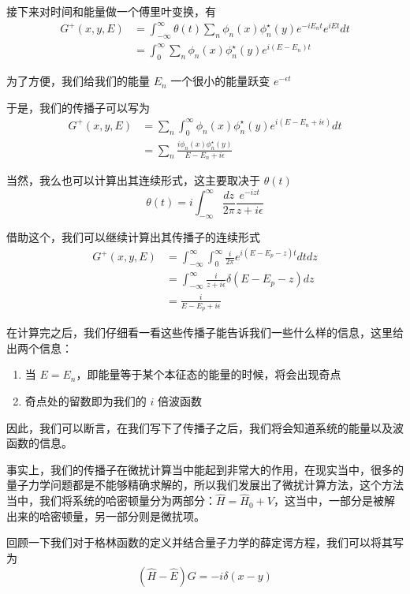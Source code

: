 \documentclass{article}
\begin{document}
接下来对时间和能量做一个傅里叶变换，有
\begin{align*}
    G^{+}(x,y,E) &= \int_{-\infty}^{\infty} \theta(t) \sum_n \phi_n(x)\phi_n^\star(y)e^{-iE_n t} e^{iEt} dt \\
    &= \int_{0}^{\infty}\sum_n \phi_n(x)\phi_n^\star(y)e^{i(E - E_n)t}
\end{align*}

为了方便，我们给我们的能量 $E_n$ 一个很小的能量跃变 $e^{-\epsilon t}$

于是，我们的传播子可以写为
\begin{align*}
    G^{+}(x,y,E) &= \sum_n \int_{0}^{\infty}\phi_n(x)\phi_n^\star(y)e^{i(E - E_n +i\epsilon)}dt \\
    &= \sum_n \frac{i\phi_n(x)\phi_n^\star(y)}{E - E_n +i\epsilon}
\end{align*}

当然，我么也可以计算出其连续形式，这主要取决于 $\theta(t)$
\begin{equation*}
    \theta(t) = i \int_{-\infty}^{\infty} \frac{dz}{2\pi}\frac{e^{-izt}}{z + i\epsilon}
\end{equation*}

借助这个，我们可以继续计算出其传播子的连续形式
\begin{align*}
    G^{+}(x,y,E) &= \int_{-\infty}^{\infty} \int_{0}^{\infty} \frac{i}{2\pi}e^{i(E - E_p -z)t} dt dz\\
    &= \int_{-\infty}^{\infty} \frac{i}{z + i \epsilon} \delta(E - E_p -z) dz \\
    &= \frac{i}{E - E_p + i\epsilon}
\end{align*}

在计算完之后，我们仔细看一看这些传播子能告诉我们一些什么样的信息，这里给出两个信息：
\begin{enumerate}
    \item 当 $E = E_n$，即能量等于某个本征态的能量的时候，将会出现奇点
    \item 奇点处的留数即为我们的 $i$ 倍波函数
\end{enumerate}

因此，我们可以断言，在我们写下了传播子之后，我们将会知道系统的能量以及波函数的信息。

事实上，我们的传播子在微扰计算当中能起到非常大的作用，在现实当中，很多的量子力学问题都是不能够精确求解的，所以我们发展出了微扰计算方法，这个方法当中，我们将系统的哈密顿量分为两部分：$\hat{H} = \hat{H}_0 + V$，这当中，一部分是被解出来的哈密顿量，另一部分则是微扰项。

回顾一下我们对于格林函数的定义并结合量子力学的薛定谔方程，我们可以将其写为
\begin{equation*}
    \left(\hat{H} - \hat{E}\right) G = -i\delta(x - y)
\end{equation*}
\end{document}
